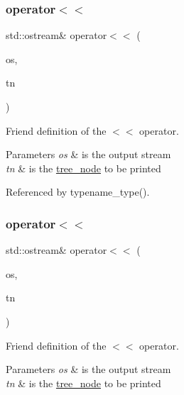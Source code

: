\subsubsection{\texorpdfstring{operator$<$$<$}{operator<<}\hspace{0.1cm}{\footnotesize\ttfamily [1/2]}}
{\footnotesize\ttfamily std\+::ostream\& operator$<$$<$ (\begin{DoxyParamCaption}\item[{std\+::ostream \&}]{os,  }\item[{const \hyperlink{classtree__node}{tree\+\_\+node} $\ast$}]{tn }\end{DoxyParamCaption})\hspace{0.3cm}{\ttfamily [friend]}}



Friend definition of the $<$$<$ operator. 


\begin{DoxyParams}{Parameters}
{\em os} & is the output stream \\
\hline
{\em tn} & is the \hyperlink{classtree__node}{tree\+\_\+node} to be printed \\
\hline
\end{DoxyParams}


Referenced by typename\+\_\+type().

\mbox{\label{classtree__node_a04c3200a2247133cf590eff539d97021}} 
\subsubsection{\texorpdfstring{operator$<$$<$}{operator<<}\hspace{0.1cm}{\footnotesize\ttfamily [2/2]}}
{\footnotesize\ttfamily std\+::ostream\& operator$<$$<$ (\begin{DoxyParamCaption}\item[{std\+::ostream \&}]{os,  }\item[{const \hyperlink{tree__node_8hpp_a6ee377554d1c4871ad66a337eaa67fd5}{tree\+\_\+node\+Ref} \&}]{tn }\end{DoxyParamCaption})\hspace{0.3cm}{\ttfamily [friend]}}



Friend definition of the $<$$<$ operator. 


\begin{DoxyParams}{Parameters}
{\em os} & is the output stream \\
\hline
{\em tn} & is the \hyperlink{classtree__node}{tree\+\_\+node} to be printed \\
\hline
\end{DoxyParams}


